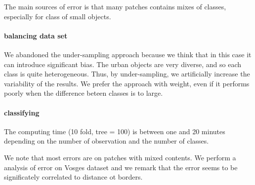 			The main sources of error is that many patches contains mixes of classes, especially for class of small objects. 
			\paragraph{balancing data set}
				 We abandoned the under-sampling approach because we think that in this case it can introduce significant bias.
				 The urban objects are very diverse, and so each class is quite heterogeneous. Thus, by under-sampling, we artificially increase the variability of the results.
				 We prefer the approach with weight, even if it performs poorly when the difference beteen classes is to large.
				
			\paragraph{classifying}
				
				The computing time (10 fold, tree = 100) is between one and 20 minutes depending on the number of observation and the number of classes.
				
				We note that most errors are on patches with mixed contents.
				We perform a analysis of error on Vosges dataset and we remark that the error seems to be significately correlated to distance ot borders.
				
				
				
								
				 
				 
		
 